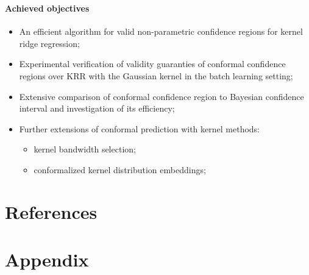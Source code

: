 \documentclass[t]{beamer}  %
\begin{document}
\begin{frame}[t]\frametitle{\insertsection}
  \framesubtitle{Achieved objectives}
  \begin{itemize}
    \item An efficient algorithm for valid non-parametric confidence regions for
    kernel ridge regression;

    \vspace{\baselineskip}
    \item Experimental verification of validity guaranties of conformal confidence
    regions over KRR with the Gaussian kernel in the batch learning setting;

    \item Extensive comparison of conformal confidence region to Bayesian confidence
    interval and investigation of its efficiency;

    \vspace{\baselineskip}
    \item Further extensions of conformal prediction with kernel methods:
    \begin{itemize}
      \item kernel bandwidth selection;
      \item conformalized kernel distribution embeddings;
    \end{itemize}
  \end{itemize}
\end{frame}


\section{References} %
\label{sec:references}

\begin{frame}[t, shrink=25]\frametitle{\insertsection}
  \printbibliography
\end{frame}


\section{Appendix} %
\label{sec:appendix}
\end{document}
